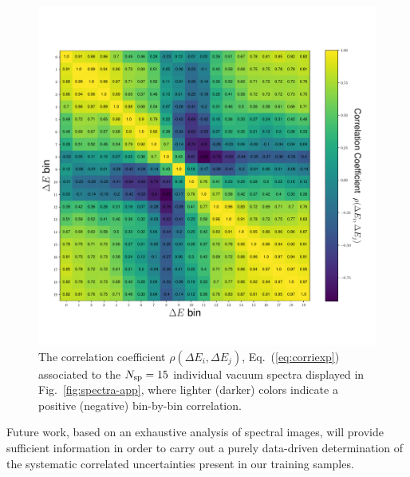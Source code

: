 {%
\begin{figure}[t]
\begin{centering}
  \includegraphics[width=0.92\linewidth]{plots/corrmat-app.pdf}
  \vspace{-0.8cm}
  \caption{\small \color{red} The correlation coefficient $\rho(\Delta E_i,\Delta E_j)$, Eq.~(\ref{eq:corriexp}) associated
    to the $N_{\rm sp}=15$ individual vacuum spectra displayed
    in Fig.~\ref{fig:spectra-app}, where lighter (darker)
    colors indicate a positive (negative) bin-by-bin correlation.
  }
\label{fig:corrmat-app}
\end{centering}
\end{figure}
  
Future work, based on an exhaustive analysis of spectral images,
will provide sufficient information in order to carry out a purely
data-driven determination of the systematic correlated
uncertainties present in our training samples.


  }
